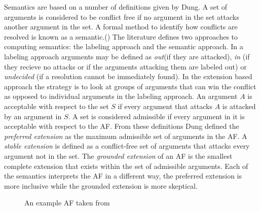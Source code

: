 Semantics are based on a number of definitions given by Dung. A set of arguments is considered to be conflict free if no argument in the set attacks another argument in the set. A formal method to identify how conflicts are resolved is known as a semantic.(\cite{baroni2011introduction}) The literature defines two approaches to computing semantics: the labeling approach and the semantic approach. In a labeling approach arguments may be defined as \textit{out}(if they are attacked), \textit{in} (if they recieve no attacks or if the arguments attacking them are labeled out) or \textit{undecided} (if a resolution cannot be immediately found). In the extension based approach the strategy is to look at groups of arguments that can win the conflict as opposed to individual arguments in the labeling approach. An argument $A$ is acceptable with respect to the set $S$ if every argument that attacks $A$ is attacked by an argument in $S$. A set is considered admissible if every argument in it is acceptable with respect to the AF. From these definitions Dung defined the \textit{preferred extension} as the maximum admissible set of arguments in the AF. A \textit{stable extension} is defined as a conflict-free set of arguments that attacks every argument not in the set. The \textit{grounded extension} of an AF is the smallest complete extension that exists within the set of admissible arguments. Each of the semantics interprets the AF in a different way, the preferred extension is more inclusive while the grounded extension is more skeptical. 

\begin{figure}[!h]
\centering
{}
\caption{An example AF taken from \cite{baroni2011introduction}}
\label{fig:arginterationBaroni}
\end{figure}

